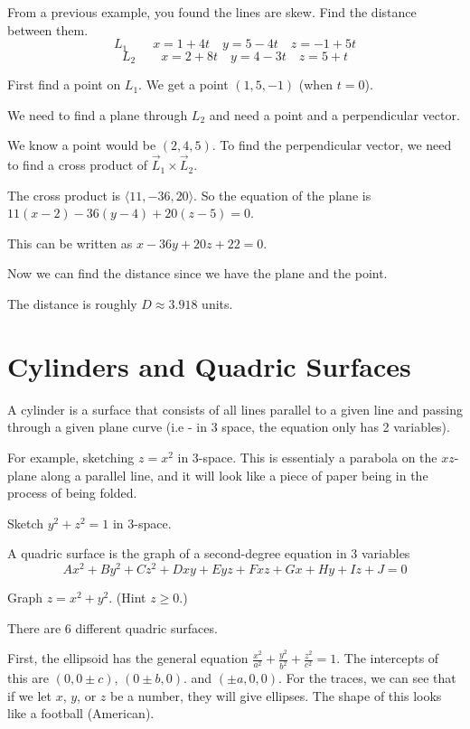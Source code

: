 \documentclass[../calc3.tex]{subfiles}
\begin{document}
\begin{example}
    From a previous example, you found the lines are skew. Find the distance between them.
    \[ L_1 \qquad x=1+4t \quad y=5-4t \quad z=-1+5t\]
    \[ L_2 \qquad x=2+8t \quad y=4-3t \quad z=5+t \]

    First find a point on $L_1$. We get a point $(1,5,-1)$ (when $t=0$).

    We need to find a plane through $L_2$ and need a point and a perpendicular vector.

    We know a point would be $(2,4,5)$. To find the perpendicular vector, we need to find a cross product of $\vec{L}_1\times \vec{L}_2$.

    The cross product is $\langle 11,-36,20\rangle$. So the equation of the plane is $11(x-2)-36(y-4)+20(z-5)=0$.

    This can be written as $x-36y+20z+22=0$.

    Now we can find the distance since we have the plane and the point. 

    The distance is roughly $D\approx 3.918$ units.
\end{example}

\section{Cylinders and Quadric Surfaces}
\begin{definition}
    A cylinder is a surface that consists of all lines parallel to a given line and passing through a given plane curve (i.e - in 3 space, the equation only has 2 variables).
\end{definition}

For example, sketching $z=x^2$ in 3-space. This is essentialy a parabola on the $xz$-plane along a parallel line, and it will look like a piece of paper being in the process of being folded.

\ex Sketch $y^2+z^2=1$ in 3-space.

\begin{definition}
    A quadric surface is the graph of a second-degree equation in 3 variables 
    \[ Ax^2+By^2+Cz^2+Dxy+Eyz+Fxz+Gx+Hy+Iz+J =0 \]
\end{definition}

\ex Graph $z=x^2+y^2$. (Hint $z\geq 0$.)

There are 6 different quadric surfaces.

First, the ellipsoid has the general equation $\frac{x^2}{a^2}+\frac{y^2}{b^2}+\frac{z^2}{c^2}=1$.
The intercepts of this are $(0,0\pm c)$, $(0\pm b,0)$. and $(\pm a,0,0)$. For the traces, we can see that if we let $x$, $y$, or $z$ be a number, they will give ellipses. The shape of this looks like a football (American).
\end{document}
